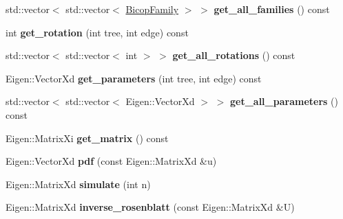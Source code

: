 \begin{DoxyCompactItemize}
\item 
std\+::vector$<$ std\+::vector$<$ \hyperlink{family_8hpp_a42e95cc06d33896199caab0c11ad44f3}{Bicop\+Family} $>$ $>$ {\bfseries get\+\_\+all\+\_\+families} () const \hypertarget{classvinecopulib_1_1_vinecop_a8b07344bedafeb618982f480240a5f15}{}\label{classvinecopulib_1_1_vinecop_a8b07344bedafeb618982f480240a5f15}

\item 
int {\bfseries get\+\_\+rotation} (int tree, int edge) const \hypertarget{classvinecopulib_1_1_vinecop_abfa48760cc636cadce6fa875a883922a}{}\label{classvinecopulib_1_1_vinecop_abfa48760cc636cadce6fa875a883922a}

\item 
std\+::vector$<$ std\+::vector$<$ int $>$ $>$ {\bfseries get\+\_\+all\+\_\+rotations} () const \hypertarget{classvinecopulib_1_1_vinecop_a33715bd84261180ea637275f9d8b881b}{}\label{classvinecopulib_1_1_vinecop_a33715bd84261180ea637275f9d8b881b}

\item 
Eigen\+::\+Vector\+Xd {\bfseries get\+\_\+parameters} (int tree, int edge) const \hypertarget{classvinecopulib_1_1_vinecop_a2ddcc85cb5f2c05edd9093fe863812f6}{}\label{classvinecopulib_1_1_vinecop_a2ddcc85cb5f2c05edd9093fe863812f6}

\item 
std\+::vector$<$ std\+::vector$<$ Eigen\+::\+Vector\+Xd $>$ $>$ {\bfseries get\+\_\+all\+\_\+parameters} () const \hypertarget{classvinecopulib_1_1_vinecop_ae1f173e30760405a445ec7d2ad8d41ea}{}\label{classvinecopulib_1_1_vinecop_ae1f173e30760405a445ec7d2ad8d41ea}

\item 
Eigen\+::\+Matrix\+Xi {\bfseries get\+\_\+matrix} () const \hypertarget{classvinecopulib_1_1_vinecop_aaac38f862f3b8ffd68ca04564fd0cf06}{}\label{classvinecopulib_1_1_vinecop_aaac38f862f3b8ffd68ca04564fd0cf06}

\item 
Eigen\+::\+Vector\+Xd {\bfseries pdf} (const Eigen\+::\+Matrix\+Xd \&u)\hypertarget{classvinecopulib_1_1_vinecop_adf3760b8dd2b6d3a9cae5426188d4489}{}\label{classvinecopulib_1_1_vinecop_adf3760b8dd2b6d3a9cae5426188d4489}

\item 
Eigen\+::\+Matrix\+Xd {\bfseries simulate} (int n)\hypertarget{classvinecopulib_1_1_vinecop_aa675aac119538648d60368a3572d1b5c}{}\label{classvinecopulib_1_1_vinecop_aa675aac119538648d60368a3572d1b5c}

\item 
Eigen\+::\+Matrix\+Xd {\bfseries inverse\+\_\+rosenblatt} (const Eigen\+::\+Matrix\+Xd \&U)\hypertarget{classvinecopulib_1_1_vinecop_a3d8819be948be348b6b3f30495b364ff}{}\label{classvinecopulib_1_1_vinecop_a3d8819be948be348b6b3f30495b364ff}

\end{DoxyCompactItemize}
